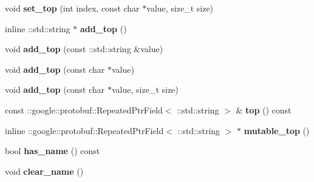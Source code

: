 \begin{DoxyCompactItemize}
\item 
\mbox{\label{classcaffe_1_1_v1_layer_parameter_a95e24ec2af4250c7217b0bacabde5082}} 
void {\bfseries set\+\_\+top} (int index, const char $\ast$value, size\+\_\+t size)
\item 
\mbox{\label{classcaffe_1_1_v1_layer_parameter_a0350f3fb763e3bbfe89a4f6a2397ef1c}} 
inline \+::std\+::string $\ast$ {\bfseries add\+\_\+top} ()
\item 
\mbox{\label{classcaffe_1_1_v1_layer_parameter_ac16c94e579a083570daacddca60c74a3}} 
void {\bfseries add\+\_\+top} (const \+::std\+::string \&value)
\item 
\mbox{\label{classcaffe_1_1_v1_layer_parameter_a1a9ebe68629434dcd78c292c99b71638}} 
void {\bfseries add\+\_\+top} (const char $\ast$value)
\item 
\mbox{\label{classcaffe_1_1_v1_layer_parameter_aa2b3d19509d844e237989ae07636ef11}} 
void {\bfseries add\+\_\+top} (const char $\ast$value, size\+\_\+t size)
\item 
\mbox{\label{classcaffe_1_1_v1_layer_parameter_a8d5c22eb2cf77e5bc175765e6b583845}} 
const \+::google\+::protobuf\+::\+Repeated\+Ptr\+Field$<$ \+::std\+::string $>$ \& {\bfseries top} () const
\item 
\mbox{\label{classcaffe_1_1_v1_layer_parameter_a0b418b52495b2f60a75fe10192cabf33}} 
inline \+::google\+::protobuf\+::\+Repeated\+Ptr\+Field$<$ \+::std\+::string $>$ $\ast$ {\bfseries mutable\+\_\+top} ()
\item 
\mbox{\label{classcaffe_1_1_v1_layer_parameter_abd9d5511ad530cafadc8d26fc0ab7db7}} 
bool {\bfseries has\+\_\+name} () const
\item 
\mbox{\label{classcaffe_1_1_v1_layer_parameter_a3f17602a06d9e2fc3711c82297408f75}} 
void {\bfseries clear\+\_\+name} ()
\item 
\mbox{\label{classcaffe_1_1_v1_layer_parameter_a4bd667bc96c57e7ba955852bfb346100}} 

\end{DoxyCompactItemize}
